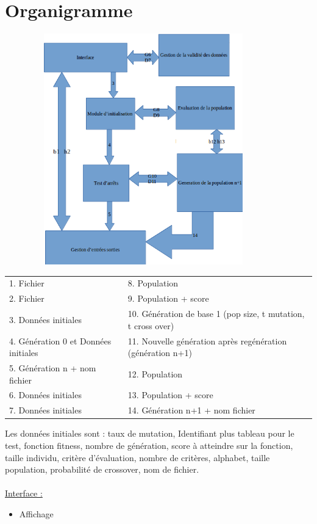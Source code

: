 \documentclass[a4paper,11pt]{article}
\begin{document}
	\section{Organigramme}
		\centerline{\includegraphics[width = 12cm,height = 10cm]{OrganigrammeV2.png}}
		\begin{center}
			\begin{tabular}{|l l|}
				\hline
				1. Fichier & 8. Population\\
				2. Fichier & 9. Population + score\\
				3. Données initiales & 10. Génération de base 1 (pop size, t mutation, t cross over)\\
				4. Génération 0 et Données initiales & 11. Nouvelle génération après regénération (génération n+1)\\
				5. Génération n + nom fichier & 12. Population\\
				6. Données initiales & 13. Population + score\\
				7. Données initiales & 14. Génération n+1 + nom fichier\\
				\hline 	
			\end{tabular}
		\end{center}
		
		Les données initiales sont :  taux de mutation, Identifiant plus tableau pour le test, fonction fitness, nombre de génération, score à atteindre sur la fonction, taille individu, critère d’évaluation, nombre de critères, alphabet, taille population, probabilité de crossover, nom de fichier.\\
		\\
		\underline{Interface :}
			\begin{itemize}
			\item Affichage
			\end{itemize}
		
\end{document}
